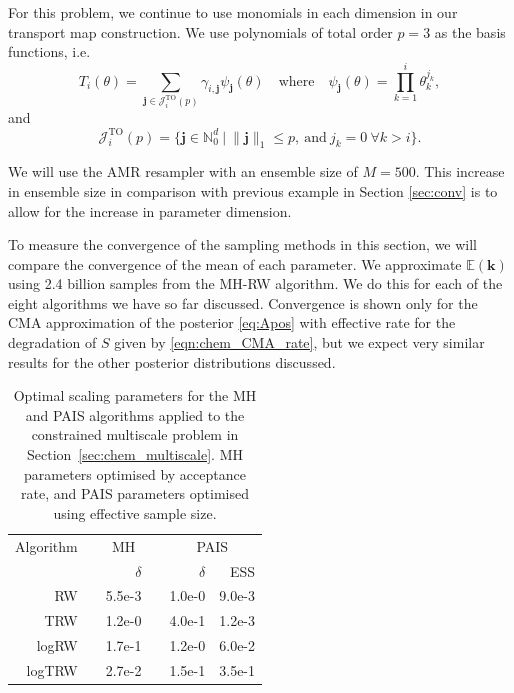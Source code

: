 \documentclass[final]{siamltex}
\begin{document}
For this problem, we continue to use monomials in each dimension in our transport map construction. We use polynomials of total order $p=3$ as the basis functions, i.e.
\[
	T_i(\theta) = \sum_{\mathbf{j}\in\mathcal{J}^{\text{TO}}_i(p)} \gamma_{i,\mathbf{j}}\psi_{\mathbf{j}}(\theta) \quad \text{where} \quad \psi_\mathbf{j}(\theta) = \prod\limits_{k=1}^i \theta_k^{j_k},
\]
and
\[
	\mathcal{J}^{\text{TO}}_i(p) = \{\mathbf{j} \in \mathbb{N}^d_0\ |\ \|\mathbf{j}\|_1 \leq p, \ \text{and}\ j_k = 0\ \forall k > i\}.
\]

We will use the AMR\cite{russ2017parallel} resampler with an ensemble size of
$M=500$. This increase in ensemble size in comparison with previous
example in Section \ref{sec:conv} is to allow for the increase in parameter dimension.

To measure the convergence of the sampling methods in this section, we
will compare the convergence of the mean of each parameter. We
approximate $\mathbb{E}(\mathbf{k})$ using 2.4 billion samples from
the MH-RW algorithm. We do this for each of the eight algorithms we
have so far discussed. Convergence is shown only for the CMA
approximation of the posterior \eqref{eq:Apos} with effective rate for
the degradation of $S$ given by \eqref{eqn:chem_CMA_rate}, but we
expect very similar results for the other posterior distributions discussed.

\begin{table}[!h]
\centering
\begin{tabular}{rrrrrr}
\toprule
	\multicolumn{1}{l}{Algorithm} & \multicolumn{3}{c}{MH} & \multicolumn{2}{c}{PAIS} \\ \cmidrule(lr){2-4} \cmidrule(lr){5-6}
	& & $\delta$ & & $\delta$ & ESS \\ \midrule
	RW & & 5.5e-3 & & 1.0e-0 & 9.0e-3 \\
	TRW & & 1.2e-0 & & 4.0e-1 & 1.2e-3 \\
	logRW & & 1.7e-1 & & 1.2e-0 & 6.0e-2 \\
	logTRW & & 2.7e-2 & & 1.5e-1 & 3.5e-1 \\
\bottomrule
\end{tabular}
\caption{Optimal scaling parameters for the MH and PAIS algorithms applied to the constrained multiscale problem in Section~\ref{sec:chem_multiscale}. MH parameters optimised by acceptance rate, and PAIS parameters optimised using effective sample size.}
\label{tab:chem_multiscale_scaling}
\end{table}
\end{document}
